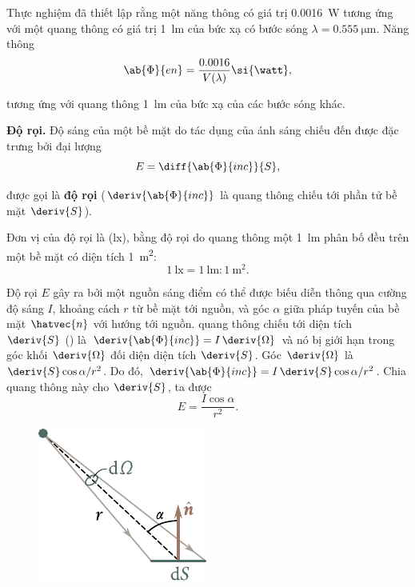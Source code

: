 Thực nghiệm đã thiết lập rằng một năng thông có giá trị \SI{0.0016}{\watt} tương ứng với một quang thông có giá trị \SI{1}{\lumen} của bức xạ có bước sóng $\lambda = \SI{0.555}{\micro\metre}$.
Năng thông
\begin{equation}\label{eq:16_43}
    \ab{\Phi}{en} = \frac{0.0016}{V(\lambda)} \si{\watt},
\end{equation}

\noindent
tương ứng với quang thông \SI{1}{\lumen} của bức xạ của các bước sóng khác.

\textbf{Độ rọi.}
Độ sáng của một bề mặt do tác dụng của ánh sáng chiếu đến được đặc trưng bởi đại lượng
\begin{equation}\label{eq:16_44}
    E = \diff{\ab{\Phi}{inc}}{S},
\end{equation}

\noindent
được gọi là \textbf{độ rọi} ($\deriv{\ab{\Phi}{inc}}$ là quang thông chiếu tới phần tử bề mặt $\deriv{S}$).

Đơn vị của độ rọi là (\si{\lux}), bằng độ rọi do quang thông một \SI{1}{\lumen} phân bố đều trên một bề mặt có diện tích \SI{1}{\metre\squared}:
\begin{equation}\label{eq:16_45}
    \SI{1}{\lux} = \SI{1}{\lumen} : \SI{1}{\metre\squared}.
\end{equation}

Độ rọi $E$ gây ra bởi một nguồn sáng điểm có thể được biếu diễn thông qua cường độ sáng $I$, khoảng cách $r$ từ bề mặt tới nguồn, và góc $\alpha$ giữa pháp tuyến của bề mặt $\hatvec{n}$ với hướng tới nguồn.
quang thông chiếu tới diện tích $\deriv{S}$ () là $\deriv{\ab{\Phi}{inc}}=I\, \deriv{\Omega}$ và nó bị giới hạn trong góc khối $\deriv{\Omega}$ đối diện diện tích $\deriv{S}$.
Góc $\deriv{\Omega}$ là $\deriv{S}\cos\alpha/r^2$.
Do đó, $\deriv{\ab{\Phi}{inc}}=I\,\deriv{S} \cos\alpha/r^2$.
Chia quang thông này cho $\deriv{S}$, ta được
\begin{equation}\label{eq:16_46}
    E = \frac{I \cos\alpha}{r^2}.
\end{equation}

\begin{figure}[!htb]
	\begin{center}
		\includegraphics[scale=1]{figures/ch_16/fig_16_4.pdf}
		\caption[]{}
		\label{fig:16_4}
	\end{center}
	\vspace{-0.8cm}
\end{figure}

